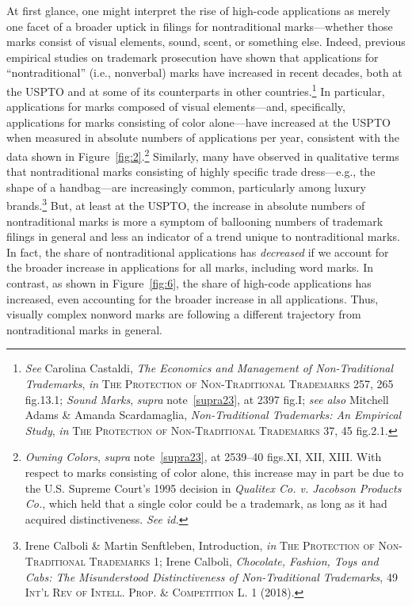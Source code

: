 \documentclass[letterpaper, 11pt, oneside]{article}
\begin{document}
At first glance, one might interpret the rise of high-code applications as merely one facet of a broader uptick in filings for nontraditional marks—whether those marks consist of visual elements, sound, scent, or something else. Indeed, previous empirical studies on trademark prosecution have shown that applications for ``nontraditional'' (i.e., nonverbal) marks have increased in recent decades, both at the USPTO and at some of its counterparts in other countries.\footnote{\textit{See} Carolina Castaldi, \textit{The Economics and Management of Non-Traditional Trademarks}, \textit{in} \textsc{The Protection of Non-Traditional Trademarks} 257, 265 fig.13.1; \textit{Sound Marks}, \textit{supra} note~\ref{supra23}, at 2397 fig.I; \textit{see also} Mitchell Adams \& Amanda Scardamaglia, \textit{Non-Traditional Trademarks: An Empirical Study}, \textit{in} \textsc{The Protection of Non-Traditional Trademarks} 37, 45 fig.2.1.} In particular, applications for marks composed of visual elements—and, specifically, applications for marks consisting of color alone—have increased at the USPTO when measured in absolute numbers of applications per year, consistent with the data shown in Figure~\ref{fig:2}.\footnote{\textit{Owning Colors}, \textit{supra} note~\ref{supra23}, at 2539–40 figs.XI, XII, XIII. With respect to marks consisting of color alone, this increase may in part be due to the U.S. Supreme Court's 1995 decision in \textit{Qualitex Co. v. Jacobson Products Co.}, which held that a single color could be a trademark, as long as it had acquired distinctiveness. \textit{See id.}} Similarly, many have observed in qualitative terms that nontraditional marks consisting of highly specific trade dress—e.g., the shape of a handbag—are increasingly common, particularly among luxury brands.\footnote{Irene Calboli \& Martin Senftleben, Introduction, \textit{in} \textsc{The Protection of Non-Traditional Trademarks} 1; Irene Calboli, \textit{Chocolate, Fashion, Toys and Cabs: The Misunderstood Distinctiveness of Non-Traditional Trademarks}, 49 \textsc{Int'l Rev of Intell. Prop. \& Competition L.} 1 (2018).}  But, at least at the USPTO, the increase in absolute numbers of nontraditional marks is more a symptom of ballooning numbers of trademark filings in general and less an indicator of a trend unique to nontraditional marks. In fact, the share of nontraditional applications has \emph{decreased} if we account for the broader increase in applications for all marks, including word marks. In contrast, as shown in Figure~\ref{fig:6}, the share of high-code applications has increased, even accounting for the broader increase in all applications. Thus, visually complex nonword marks are following a different trajectory from nontraditional marks in general.
\end{document}
